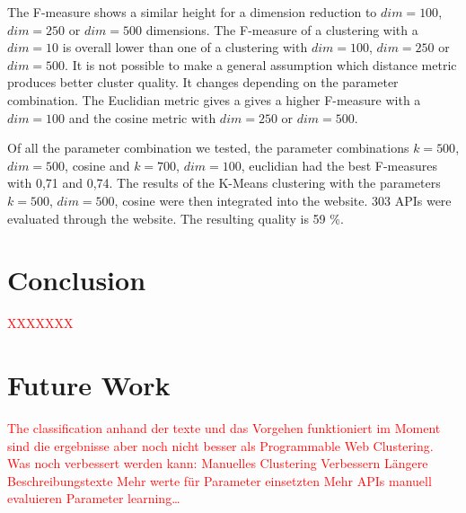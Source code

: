 \documentclass[a4paper]{IEEEtran}
\begin{document}
The F-measure shows a similar height for a dimension reduction to $dim⁡= 100$, $dim⁡= 250$ or $dim⁡= 500$ dimensions. The F-measure of a clustering with a $dim=10$ is overall lower than one of a clustering with $dim⁡= 100$, $dim⁡= 250$ or $dim⁡= 500$. 
It is not possible to make a general assumption which distance metric produces better cluster quality. It changes depending on the parameter combination. The Euclidian metric gives a gives a higher F-measure with a $dim⁡= 100$ and the cosine metric with $dim⁡= 250$ or $dim⁡= 500$.

Of all the parameter combination we tested, the parameter combinations $k⁡= 500$, $dim⁡= 500$, cosine and $k⁡= 700$, $dim⁡= 100$, euclidian had the best F-measures with 0,71 and 0,74.
The results of the K-Means clustering with the parameters $k⁡= 500$, $dim⁡= 500$, cosine were then integrated into the website. 303 APIs were evaluated through the website. The resulting quality is 59 \%.

\section{Conclusion}
\textcolor{red} {XXXXXXX}

\section{Future Work}
\textcolor{red} {The classification anhand der texte und das Vorgehen funktioniert im Moment sind die ergebnisse aber noch nicht besser als Programmable Web Clustering. Was noch verbessert werden kann: 
Manuelles Clustering Verbessern
Längere Beschreibungstexte
Mehr werte für Parameter einsetzten
Mehr APIs manuell evaluieren
Parameter learning… }




\end{document}

